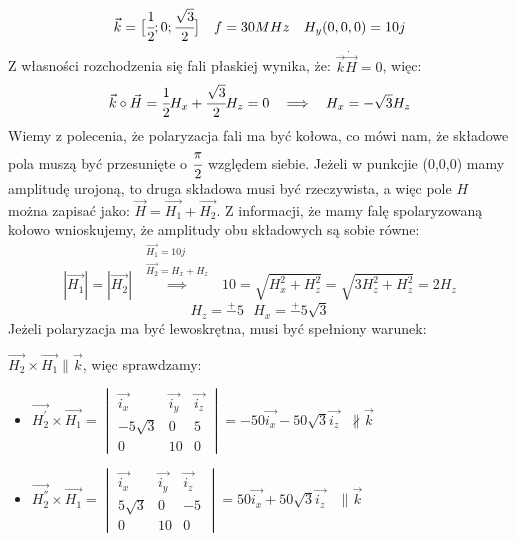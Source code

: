 \begin{solution}


$$\vec{k}=\big{[}\cfrac{1}{2};0;\cfrac{\sqrt{3}}{2}\big{]} \ \ \ f = 30 MHz \ \ \ H_{y}(0,0,0)=10j$$
Z własności rozchodzenia się fali płaskiej wynika, że: $\vec{k}\dot\vec{H}=0$, więc:
$$\vec{k}\circ\vec{H}=\cfrac{1}{2}H_{x}+\cfrac{\sqrt{3}}{2}H_{z}=0 \ \ \implies \ \ H_{x}=-\sqrt{3}H_{z}$$
Wiemy z polecenia, że polaryzacja fali ma być kołowa, co mówi nam, że składowe pola muszą być przesunięte o $\cfrac{\pi}{2}$ względem siebie. Jeżeli w punkcjie (0,0,0) mamy amplitudę urojoną, to druga składowa musi być rzeczywista, a więc pole $H$ można zapisać jako: $\vec{H}=\vec{H_{1}}+\vec{H_{2}}$. Z informacji, że mamy falę spolaryzowaną kołowo wnioskujemy, że amplitudy obu składowych są sobie równe:
$$|\vec{H_{1}}|=|\vec{H_{2}}| \ \ \stackrel{\substack{\vec{H_{1}}=10j \\ \vec{H_{2}}=H_{x}+H_{z}} }{\implies} \ \ 10=\sqrt{H_{x}^{2}+H_{z}^{2}}=\sqrt{3H_{z}^{2}+H_{z}^{2}}=2H_{z}$$
$$H_{z}=\stackrel{+}{-}5\ \ \ H_{x}=\stackrel{+}{-}5\sqrt{3}$$
Jeżeli polaryzacja ma być lewoskrętna, musi być spełniony warunek:\\
\begin{center} $ \vec{H_{2}} \times \vec{H_{1}} \parallel \vec{k} $, więc sprawdzamy:\\
\end{center}

\begin{itemize}
\item $\vec{H_{2}^{'}}\times\vec{H_{1}} = \begin{vmatrix}
					                    \vec{i_{x}}&\vec{i_{y}}&\vec{i_{z}}\\
					                    -5\sqrt{3}&0&5\\
					                    0&10&0\end{vmatrix} = -50\vec{i_{x}} -50\sqrt{3}\vec{i_{z}} \ \ \ \not\parallel \vec{k}$
					                    
\item $\vec{H_{2}^{''}}\times\vec{H_{1}} = \begin{vmatrix}
					                    \vec{i_{x}}&\vec{i_{y}}&\vec{i_{z}}\\
					                    5\sqrt{3}&0&-5\\
					                    0&10&0\end{vmatrix} = 50\vec{i_{x}} + 50\sqrt{3}\vec{i_{z}} \ \ \ \ \parallel \vec{k}$

\end{itemize}


\end{solution}
